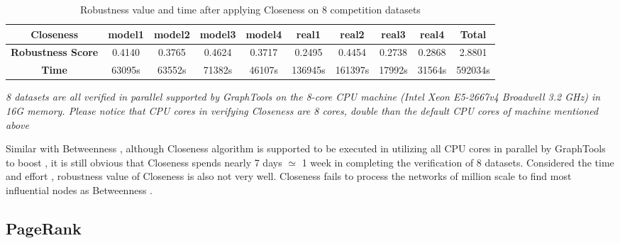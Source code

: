 \documentclass{article}
\begin{document}
	\begin{table}[!htbp]
		\begin{adjustwidth}{-1.3cm}{}		
			\begin{threeparttable}
				\centering
				\caption{Robustness value and time after applying Closeness on 8 competition datasets}
				\label{tab:table3}
				
				\begin{tabular}{|c|c|c|c|c|c|c|c|c|c|}
					\hline
					\textbf{Closeness}          & \textbf{model1} & \textbf{model2} & \textbf{model3} & \textbf{model4} & \textbf{real1} & \textbf{real2} & \textbf{real3} & \textbf{real4} & \textbf{Total} \\ \hline
					\textbf{Robustness Score} & 0.4140          & 0.3765          & 0.4624          & 0.3717          & 0.2495         & 0.4454         & 0.2738         & 0.2868         & 2.8801         \\ \hline
					\textbf{Time}     & 63095s           & 63552s           & 71382s           & 46107s           & 136945s         & 161397s         & 17992s          & 31564s          & 592034s         \\ \hline								
				\end{tabular}
				\begin{tablenotes}
					\small
					\item\textit{8 datasets are all verified in parallel supported by GraphTools \cite{peixotographtool2014} on the 8-core CPU machine (Intel Xeon E5-2667v4 Broadwell 3.2 GHz) in 16G memory. Please notice that CPU cores in verifying Closeness are 8 cores, double than the default CPU cores of machine mentioned above}
				\end{tablenotes}			
			\end{threeparttable}
		\end{adjustwidth}
	\end{table}
	
	Similar with Betweenness , although Closeness algorithm is supported to be executed in utilizing all CPU cores in parallel by GraphTools to boost , it is still obvious that Closeness spends nearly 7 days $\simeq$ 1 week in completing the verification of 8 datasets. Considered the time and effort , robustness value of Closeness is also not very well. Closeness fails to process the networks of million scale to find most influential nodes as Betweenness .
	
	
	\subsection{PageRank}	
	
\end{document}
